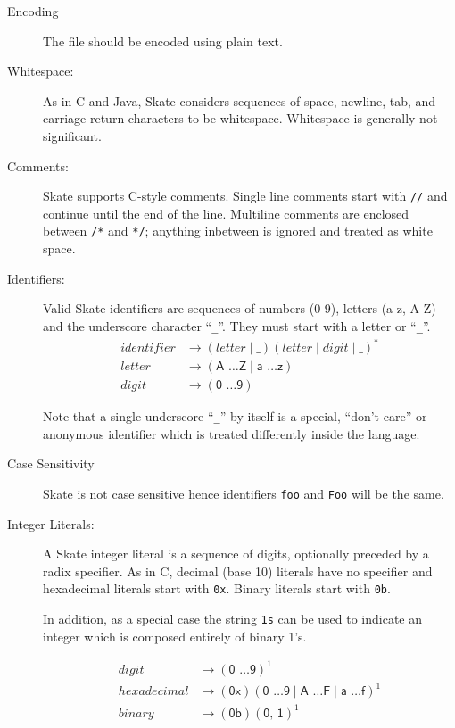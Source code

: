 \documentclass[a4paper,11pt,twoside]{report}
\begin{document}
{{\begin{description}
\item[Encoding] The file should be encoded using plain text.
\item[Whitespace:]  As in C and Java, Skate considers sequences of
  space, newline, tab, and carriage return characters to be
  whitespace.  Whitespace is generally not significant. 

\item[Comments:] Skate supports C-style comments.  Single line comments
  start with \texttt{//} and continue until the end of the line.
  Multiline comments are enclosed between \texttt{/*} and \texttt{*/};
  anything inbetween is ignored and treated as white space.

\item[Identifiers:] Valid Skate identifiers are sequences of numbers
  (0-9), letters (a-z, A-Z) and the underscore character ``\texttt{\_}''.  They
  must start with a letter or ``\texttt{\_}''.  
  \begin{align*}
    identifier & \rightarrow ( letter \mid \_ ) (letter \mid digit \mid \_)^{\textrm{*}} \\
    letter & \rightarrow (\textsf{A \ldots Z} \mid  \textsf{a \ldots z})\\
    digit & \rightarrow (\textsf{0 \ldots 9})
\end{align*}

  Note that a single underscore ``\texttt{\_}'' by itself is a special,
  ``don't care'' or anonymous identifier which is treated differently
  inside the language. 
  
\item[Case Sensitivity] Skate is not case sensitive hence identifiers 
\texttt{foo} and \texttt{Foo} will be the same.  
  
\item[Integer Literals:] A Skate integer literal is a sequence of
  digits, optionally preceded by a radix specifier.  As in C, decimal (base 10)
  literals have no specifier and hexadecimal literals start with
  \texttt{0x}.  Binary literals start with \texttt{0b}. 

  In addition, as a special case the string \texttt{1s} can be used to
  indicate an integer which is composed entirely of binary 1's. 

\begin{align*}
digit & \rightarrow (\textsf{0 \ldots 9})^{\textrm{1}}\\
hexadecimal & \rightarrow (\textsf{0x})(\textsf{0 \ldots 9} \mid \textsf{A \ldots F} \mid \textsf{a \ldots f})^{\textrm{1}}\\
binary & \rightarrow (\textsf{0b})(\textsf{0, 1})^{\textrm{1}}\\
\end{align*}


\end{description}}}
\end{document}
